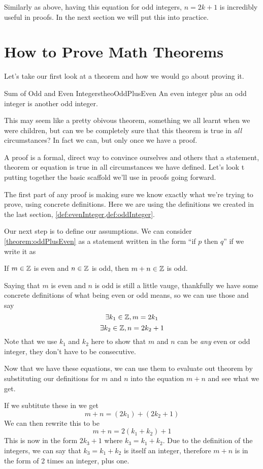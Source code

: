 Similarly as above, having this equation for odd integers, $n = 2k + 1$ is incredibly useful in proofs. In the next section we will put this into practice.

\section{How to Prove Math Theorems}
Let's take our first look at a theorem and how we would go about proving it.

\begin{theorem}[label={theorem:oddPlusEven}]{Sum of Odd and Even Integers}{theoOddPlusEven}
    An even integer plus an odd integer is another odd integer.
\end{theorem}
This may seem like a pretty obivous theorem, something we all learnt when we were children, but can we be completely sure that this theorem is true in \emph{all} circumstances? In fact we can, but only once we have a proof.

A proof is a formal, direct way to convince ourselves and others that a statement, theorem or equation is true in all circumstances we have defined. Let's look t putting together the basic scaffold we'll use in proofs going forward.

The first part of any proof is making sure we know exactly what we're trying to prove, using concrete definitions. Here we are using the definitions we created in the last section, \cref{def:evenInteger,def:oddInteger}.

Our next step is to define our assumptions. We can consider \cref{theorem:oddPlusEven} as a statement written in the form ``if $p$ then $q$'' if we write it as
\begin{center}
    If $m \in \mathbb{Z}$ is even and $n \in \mathbb{Z}$ is odd, then $m + n \in \mathbb{Z}$ is odd.
\end{center}

Saying that $m$ is even and $n$ is odd is still a little vauge, thankfully we have some concrete definitions of what being even or odd means, so we can use those and say
$$\exists k_1 \in \mathbb{Z}, m = 2k_1 $$
$$\exists k_2 \in \mathbb{Z}, n = 2k_2 + 1$$
Note that we use $k_1$ and $k_2$ here to show that $m$ and $n$ can be \emph{any} even or odd integer, they don't have to be consecutive.

Now that we have these equations, we can use them to evaluate out theorem by substituting our definitions for $m$ and $n$ into the equation $m + n$ and see what we get.

If we subtitute these in we get
$$m + n = (2k_1) + (2k_2 + 1)$$
We can then rewrite this to be
$$m + n = 2(k_1+k_2) + 1$$
This is now in the form $2k_3 + 1$ where $k_3 = k_1 + k_2$. Due to the definition of the integers, we can say that $k_3 = k_1 + k_2$ is itself an integer, therefore $m + n$ is in the form of 2 times an integer, plus one.

